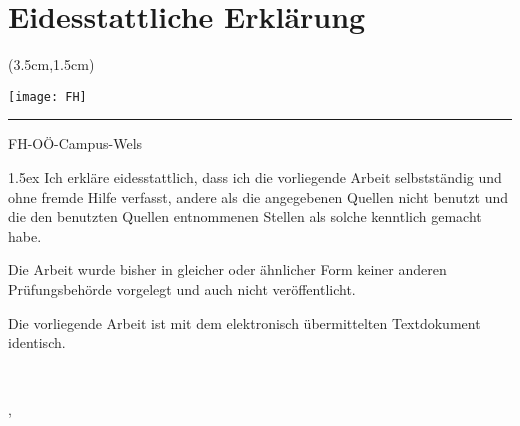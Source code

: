 
	{
	\renewcommand*\chapterheadstartvskip{\vspace*{7\topskip}}
	\chapter{Eidesstattliche Erklärung}
	}

	\begin{textblock*}{15cm}(3.5cm,1.5cm)
		\begin{flushright}
			\texttt{[image: FH]}
		\end{flushright}
		\rule{15cm}{0.1mm}
		\vspace{-2.2cm}
		\begin{flushright}
			FH-OÖ-Campus-Wels
		\end{flushright}
	\end{textblock*}

	\vfill
	\begin{minipage}[t]{0.33\textwidth}
	\end{minipage}
	\hfill
	\begin{minipage}[t]{0.66\textwidth}
		{\parskip 1.5ex		%
			Ich erkläre eidesstattlich, dass ich die vorliegende Arbeit selbstständig und ohne fremde Hilfe verfasst, andere als die angegebenen Quellen nicht benutzt und die den benutzten Quellen entnommenen Stellen als solche kenntlich gemacht habe.

            Die Arbeit wurde bisher in gleicher oder ähnlicher Form keiner anderen Prüfungsbehörde vorgelegt und auch nicht veröffentlicht.

            Die vorliegende Arbeit ist mit dem elektronisch übermittelten Textdokument identisch.
		}
		\vspace{25mm}

		\begin{minipage}[t]{7.5cm}
			\centering \dotfill \\
		\end{minipage}
		\vskip 6pt
		\printauthor
		\vskip 6pt
		\printlocation, {\printsubmonth\ \printsubyear}
	\end{minipage}
	\vfill